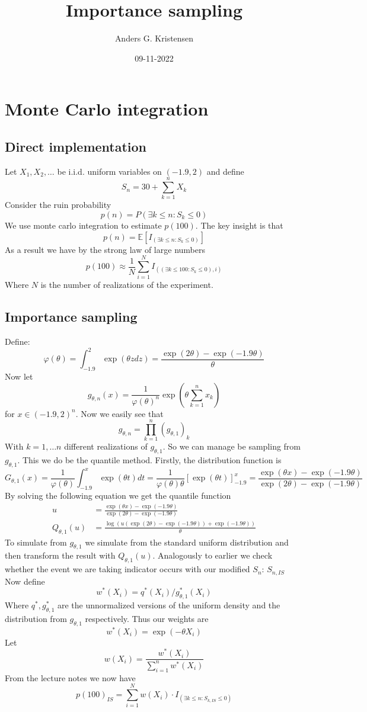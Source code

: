 \documentclass[a4paper, 11 pt]{article}
\title{Importance sampling}
\author{Anders G. Kristensen}
\date{09-11-2022}
\begin{document}
\maketitle
\section{Monte Carlo integration}
\subsection{Direct implementation}
\noindent Let $X_1,X_2,\dots$ be i.i.d. uniform variables on $(-1.9, 2)$ and define
\[
    S_n = 30 + \sum_{k = 1}^n X_k
\]
Consider the ruin probability
\[
    p(n) = P(\exists k\leq n : S_k \leq 0)
\]
We use monte carlo integration to estimate $p(100)$. The key insight is that
\[
    p(n) = \mathbb{E}\left[I_{\left(\exists k\leq n : S_k\leq 0\right)}\right]    
\]
As a result we have by the strong law of large numbers
\[
    p(100) \approx \frac{1}{N}\sum_{i = 1}^N I_{\left(\left(\exists k\leq 100 : S_k\leq 0\right),i\right)}
\]
Where $N$ is the number of realizations of the experiment.
\subsection{Importance sampling}
Define:
\[
\varphi(\theta) = \int_{-1.9}^2 \exp\left(\theta z dz\right) = \frac{\exp\left(2\theta\right)-\exp\left(-1.9\theta\right)}{\theta}    
\]
Now let 
\[
    g_{\theta, n}(x) = \frac{1}{\varphi(\theta)^n}\exp{\left(\theta \sum_{k = 1}^n x_k\right)}  
\]
for $x\in(-1.9,2)^n$. Now we easily see that 
\[
    g_{\theta, n} = \prod_{k = 1}^n\left(g_{\theta, 1}\right)_k
\]
With $k = 1,\dots n$ different realizations of $g_{\theta,1}$. So we can manage be sampling from $g_{\theta,1}$. This we do be the quantile method. Firstly, the distribution function is
\[
    G_{\theta,1}(x) = \frac{1}{\varphi(\theta)}\int_{-1.9}^x \exp\left(\theta t\right)dt = \frac{1}{\varphi(\theta)\theta}\left[\exp(\theta t)\right]_{-1.9}^x = \frac{\exp(\theta x)-\exp(-1.9\theta)}{\exp(2\theta)-\exp(-1.9\theta)}
\]
By solving the following equation we get the quantile function
\begin{align*}
    u &= \frac{\exp\left(\theta x\right)-\exp(-1.9\theta)}{\exp(2\theta)-\exp(-1.9\theta)} \\
    Q_{\theta,1}(u) &= \frac{\log\left(u\left(\exp(2\theta)-\exp(-1.9\theta)\right)+\exp(-1.9\theta)\right)}{\theta}
\end{align*}
To simulate from $g_{\theta,1}$ we simulate from the standard uniform distribution and then transform the result with $Q_{\theta,1}(u)$. Analogously to earlier we check whether the event we are taking indicator occurs with our modified $S_n$: $S_{n,IS}$ Now define 
\[
    w^*(X_i) = q^*(X_i)/g_{\theta,1}^*(X_i)    
\]
Where $q^*, g_{\theta,1}^*$ are the unnormalized versions of the uniform density and the distribution from $g_{\theta,1}$ respectively. Thus our weights are
\[
    w^*(X_i) = \exp\left(-\theta X_i\right)    
\]
Let
\[
w(X_i) = \frac{w^*(X_i)}{\sum_{i = 1}^n w^*(X_i)}  
\]
From the lecture notes we now have 
\[
p(100)_{IS} = \sum_{i = 1}^N w(X_i)\cdot I_{\left(\exists k\leq n :S_{k,IS}\leq 0\right)}
\]
\end{document}
